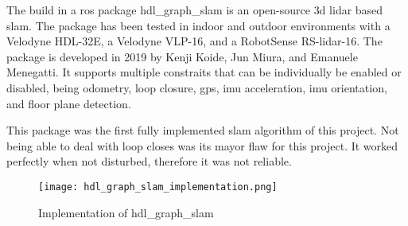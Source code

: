 The build in a \acs{ros} package \mbox{hdl\_graph\_slam} is an open\hyp{}source \acs{3d} \acs{lidar} based \acs{slam}. The package has been tested in indoor and outdoor environments with a Velodyne HDL\hyp{}32E, a Velodyne VLP\hyp{}16, and a RobotSense RS\hyp{}\acs{lidar}\hyp{}16. The package is developed in 2019 by Kenji Koide, Jun Miura, and Emanuele Menegatti. It supports multiple constraits that can be individually be enabled or disabled, being odometry, loop closure, \acs{gps}, \acs{imu} acceleration, \acs{imu} orientation, and floor plane detection. \cite{koide2019portable}

This package was the first fully implemented \acs{slam} algorithm of this project. Not being able to deal with loop closes was its mayor flaw for this project. It worked perfectly when not disturbed, therefore it was not reliable.

\begin{figure}[!h]
  \centering
  \texttt{[image: hdl\_graph\_slam\_implementation.png]}
  \caption{Implementation of hdl\_graph\_slam}
  \label{fig:hdl_graph_slam_implementation}
\end{figure}